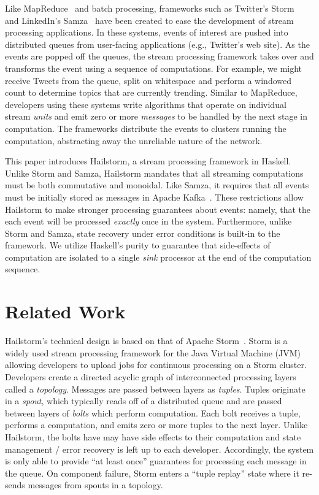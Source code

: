 \documentclass[10pt,nocopyrightspace]{sigplanconf}
\begin{document}
Like MapReduce~\cite{mapreduce} and batch processing, frameworks such as
Twitter's Storm~\cite{storm} and LinkedIn's Samza~\cite{samza} have been
created to ease the development of stream processing applications. In these
systems, events of interest are pushed into distributed queues from user-facing
applications (e.g., Twitter's web site).  As the events are popped off the
queues, the stream processing framework takes over and transforms the event
using a sequence of computations. For example, we might receive Tweets from the
queue, split on whitespace and perform a windowed count to determine topics
that are currently trending. Similar to MapReduce, developers using these
systems write algorithms that operate on individual stream \textit{units} and
emit zero or more \textit{messages} to be handled by the next stage in
computation. The frameworks distribute the events to clusters running the
computation, abstracting away the unreliable nature of the network.

This paper introduces Hailstorm, a stream processing framework in Haskell.
Unlike Storm and Samza, Hailstorm mandates that all streaming computations must
be both commutative and monoidal. Like Samza, it requires that all events must
be initially stored as messages in Apache Kafka~\cite{kafka}.  These
restrictions allow Hailstorm to make stronger processing guarantees about
events: namely, that the each event will be processed \textit{exactly} once in
the system. Furthermore, unlike Storm and Samza, state recovery under error
conditions is built-in to the framework. We utilize Haskell's purity to
guarantee that side-effects of computation are isolated to a single
\textit{sink} processor at the end of the computation sequence.


\section{Related Work}
Hailstorm's technical design is based on that of Apache Storm~\cite{storm}.
Storm is a widely used stream processing framework for
the Java Virtual Machine (JVM) allowing developers to upload jobs for continuous
processing on a Storm cluster. Developers create a directed acyclic graph of
interconnected processing layers called a \textit{topology}.
Messages are passed between layers as
\textit{tuples}. Tuples originate in a \textit{spout}, which typically reads
off of a distributed queue and are passed between layers of \textit{bolts} which
perform computation. Each bolt receives a tuple, performs a computation, and
emits zero or more tuples to the next layer. Unlike Hailstorm, the bolts have
may have side effects to their computation and state management / error recovery
is left up to each developer. Accordingly, the system is only able to provide
``at least once'' guarantees for processing each message in the queue. On
component failure, Storm enters a ``tuple replay'' state where it re-sends
messages from spouts in a topology.
\end{document}
